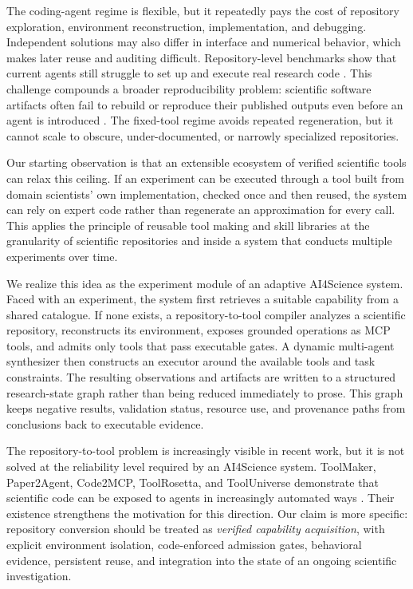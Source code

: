 \documentclass[letterpaper]{article} %
\begin{document}
The coding-agent regime is flexible, but it repeatedly pays the cost of repository exploration, environment reconstruction, implementation, and debugging. Independent solutions may also differ in interface and numerical behavior, which makes later reuse and auditing difficult. Repository-level benchmarks show that current agents still struggle to set up and execute real research code \citep{bogin2024super,siegel2025corebench,starace2025paperbench,researchenvbench2026}. This challenge compounds a broader reproducibility problem: scientific software artifacts often fail to rebuild or reproduce their published outputs even before an agent is introduced \citep{samuel2024jupyter}. The fixed-tool regime avoids repeated regeneration, but it cannot scale to obscure, under-documented, or narrowly specialized repositories.

Our starting observation is that an extensible ecosystem of verified scientific tools can relax this ceiling. If an experiment can be executed through a tool built from domain scientists' own implementation, checked once and then reused, the system can rely on expert code rather than regenerate an approximation for every call. This applies the principle of reusable tool making and skill libraries \citep{cai2024latm,yuan2024craft,trove2024,regal2024,wang2023voyager} at the granularity of scientific repositories and inside a system that conducts multiple experiments over time.

We realize this idea as the experiment module of an adaptive AI4Science system. Faced with an experiment, the system first retrieves a suitable capability from a shared catalogue. If none exists, a repository-to-tool compiler analyzes a scientific repository, reconstructs its environment, exposes grounded operations as MCP tools, and admits only tools that pass executable gates. A dynamic multi-agent synthesizer then constructs an executor around the available tools and task constraints. The resulting observations and artifacts are written to a structured research-state graph rather than being reduced immediately to prose. This graph keeps negative results, validation status, resource use, and provenance paths from conclusions back to executable evidence.

The repository-to-tool problem is increasingly visible in recent work, but it is not solved at the reliability level required by an AI4Science system. ToolMaker, Paper2Agent, Code2MCP, ToolRosetta, and ToolUniverse demonstrate that scientific code can be exposed to agents in increasingly automated ways \citep{wolflein2025toolmaker,miao2025paper2agent,ouyang2025code2mcp,di2026toolrosetta,gao2025tooluniverse}. Their existence strengthens the motivation for this direction. Our claim is more specific: repository conversion should be treated as \emph{verified capability acquisition}, with explicit environment isolation, code-enforced admission gates, behavioral evidence, persistent reuse, and integration into the state of an ongoing scientific investigation.
\end{document}
